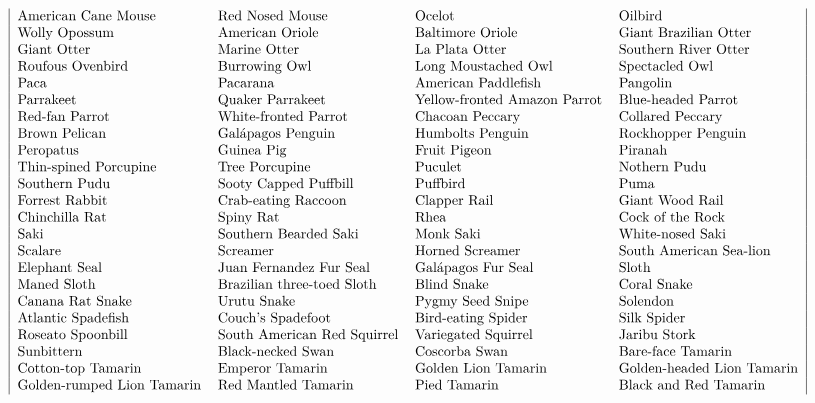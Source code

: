 \[\begin{tabular}{|llll|}
American Cane Mouse   & Red Nosed Mouse   & Ocelot  & Oilbird  \\
Wolly Opossum   & American Oriole  & Baltimore Oriole   & Giant Brazilian Otter  \\
Giant Otter  & Marine Otter   & La Plata Otter   & Southern River Otter \\
Roufous Ovenbird   & Burrowing Owl   & Long Moustached Owl  & Spectacled Owl  \\
Paca   & Pacarana  & American Paddlefish   & Pangolin  \\
Parrakeet  & Quaker Parrakeet   & Yellow-fronted Amazon Parrot   & Blue-headed Parrot \\
Red-fan Parrot   & White-fronted Parrot   & Chacoan Peccary  & Collared Peccary  \\
Brown Pelican   & Gal\'{a}pagos Penguin  & Humbolts Penguin   & Rockhopper Penguin  \\
Peropatus  & Guinea Pig   & Fruit Pigeon   & Piranah \\
Thin-spined Porcupine   & Tree Porcupine   & Puculet  & Nothern Pudu  \\
Southern Pudu   & Sooty Capped Puffbill  & Puffbird   & Puma  \\
Forrest Rabbit  & Crab-eating Raccoon   & Clapper Rail   & Giant Wood Rail \\
Chinchilla Rat   & Spiny Rat   & Rhea  & Cock of the Rock  \\
Saki   & Southern Bearded Saki  & Monk Saki   & White-nosed Saki  \\
Scalare  & Screamer   & Horned Screamer   & South American Sea-lion \\
Elephant Seal   & Juan Fernandez Fur Seal   & Gal\'{a}pagos Fur Seal  & Sloth  \\
Maned Sloth   & Brazilian three-toed Sloth  & Blind Snake   & Coral Snake  \\
Canana Rat Snake  & Urutu Snake   & Pygmy Seed Snipe   & Solendon \\
Atlantic Spadefish   & Couch's Spadefoot   & Bird-eating Spider  & Silk Spider  \\
Roseato Spoonbill   & South American Red Squirrel  & Variegated Squirrel   & Jaribu Stork  \\
Sunbittern  & Black-necked Swan   & Coscorba Swan   & Bare-face Tamarin \\
Cotton-top Tamarin   & Emperor Tamarin   & Golden Lion Tamarin  & Golden-headed Lion Tamarin  \\
Golden-rumped Lion Tamarin   & Red Mantled Tamarin  & Pied Tamarin   & Black and Red Tamarin  \\

\end{tabular}\]
